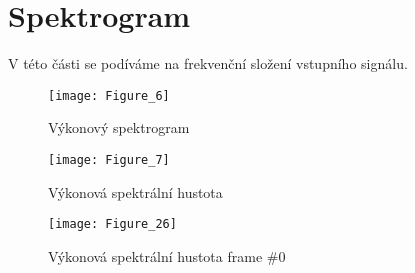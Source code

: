 \section{Spektrogram}

V této části se podíváme na frekvenční složení vstupního signálu.

\begin{figure}[H] 
	\centering
	\texttt{[image: Figure\_6]}
	\caption{Výkonový spektrogram}
\end{figure}

\begin{figure}[H] 
	\centering
	\texttt{[image: Figure\_7]}
	\caption{Výkonová spektrální hustota}
\end{figure}

\begin{figure}[H] 
	\centering
	\texttt{[image: Figure\_26]}
	\caption{Výkonová spektrální hustota frame \#0}
\end{figure}